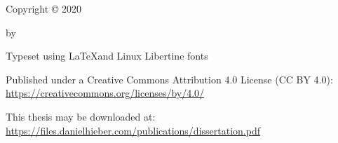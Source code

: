 \setcounter{page}{3}

\vspace*{\fill}

\begin{center}

  \thetitle

  \vspace{3em}

  Copyright {\copyright} 2020

  by

  \theauthor

\end{center}

\vspace*{\fill}

\begin{flushleft}
\begin{singlespacing}

  \setlength{\parskip}{0.5em}

  Typeset using \LaTeX and Linux Libertine fonts

  Published under a Creative Commons Attribution 4.0 License (CC BY 4.0): \href{https://creativecommons.org/licenses/by/4.0/}{https://creativecommons.org/licenses/by/4.0/}

  This thesis may be downloaded at: \href{https://files.danielhieber.com/publications/dissertation.pdf}{https://files.danielhieber.com/publications/dissertation.pdf}

  \setlength{\parskip}{0em}

\end{singlespacing}
\end{flushleft}
